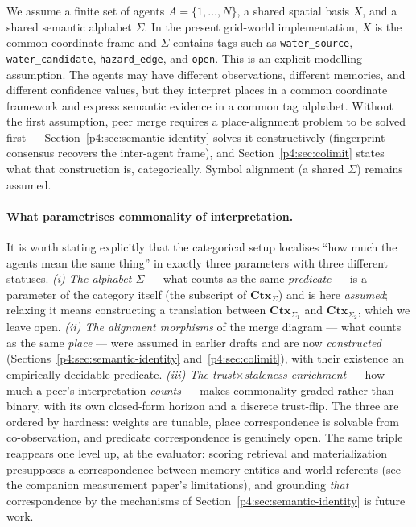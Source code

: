 \documentclass{article}
\begin{document}
We assume a finite set of agents $A=\{1,\ldots,N\}$, a shared spatial
basis $X$, and a shared semantic alphabet $\Sigma$. In the present
grid-world implementation, $X$ is the common coordinate frame and
$\Sigma$ contains tags such as \texttt{water\_source},
\texttt{water\_candidate}, \texttt{hazard\_edge}, and \texttt{open}.
This is an explicit modelling assumption. The agents may have different
observations, different memories, and different confidence values, but
they interpret places in a common coordinate framework and express
semantic evidence in a common tag alphabet. Without the first
assumption, peer merge requires a place-alignment problem to be solved
first --- Section~\ref{p4:sec:semantic-identity} solves it constructively
(fingerprint consensus recovers the inter-agent frame), and
Section~\ref{p4:sec:colimit} states what that construction is,
categorically. Symbol alignment (a shared $\Sigma$) remains assumed.

\paragraph{What parametrises commonality of interpretation.} It is
worth stating explicitly that the categorical setup localises ``how
much the agents mean the same thing'' in exactly three parameters with
three different statuses. \emph{(i) The alphabet $\Sigma$} --- what
counts as the same \emph{predicate} --- is a parameter of the category
itself (the subscript of $\mathbf{Ctx}_\Sigma$) and is here
\emph{assumed}; relaxing it means constructing a translation between
$\mathbf{Ctx}_{\Sigma_1}$ and $\mathbf{Ctx}_{\Sigma_2}$, which we leave
open. \emph{(ii) The alignment morphisms} of the merge diagram ---
what counts as the same \emph{place} --- were assumed in earlier
drafts and are now \emph{constructed}
(Sections~\ref{p4:sec:semantic-identity} and~\ref{p4:sec:colimit}), with
their existence an empirically decidable predicate. \emph{(iii) The
trust$\times$staleness enrichment} --- how much a peer's
interpretation \emph{counts} --- makes commonality graded rather than
binary, with its own closed-form horizon and a discrete trust-flip.
The three are ordered by hardness: weights are tunable, place
correspondence is solvable from co-observation, and predicate
correspondence is genuinely open. The same triple reappears one level
up, at the evaluator: scoring retrieval and materialization
presupposes a correspondence between memory entities and world
referents (see the companion measurement paper's limitations), and
grounding \emph{that} correspondence by the mechanisms of
Section~\ref{p4:sec:semantic-identity} is future work.
\end{document}
